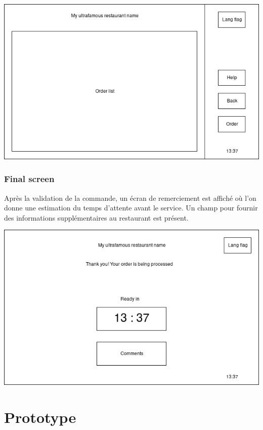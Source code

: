 \documentclass[a4paper,12pt]{article}
\begin{document}
\begin{center}
	\includegraphics[width=\textwidth]{confirmation_screen.jpg}
\end{center}

\subsubsection{Final screen}

Après la validation de la commande, un écran de remerciement est affiché où l'on donne une estimation du temps
d'attente avant le service. Un champ pour fournir des informations supplémentaires au restaurant est présent.

\begin{center}
	\includegraphics[width=\textwidth]{final_screen.jpg}
\end{center}

\section{Prototype}
\end{document}
